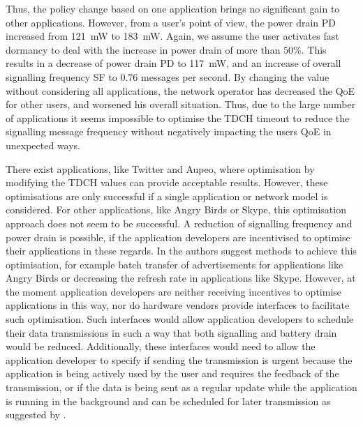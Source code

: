 Thus, the policy change based on one application brings no significant gain to other applications.
However, from a user's point of view, the power drain \gls{PD} increased from \SI{121}{\milli\watt} to \SI{183}{\milli\watt}.
Again, we assume the user activates fast dormancy to deal with the increase in power drain of more than $50\%$.
This results in a decrease of power drain \gls{PD} to \SI{117}{\milli\watt}, and an increase of overall signalling frequency \gls{SF} to \(0.76\) messages per second.
By changing the value without considering all applications, the network operator has decreased the \gls{QoE} for other users, and worsened his overall situation.
Thus, due to the large number of applications it seems impossible to optimise the \gls{TDCH} timeout to reduce the signalling message frequency without negatively impacting the users \gls{QoE} in unexpected ways.

There exist applications, like Twitter and Aupeo, where optimisation by modifying the \gls{TDCH} values can provide acceptable results.
However, these optimisations are only successful if a single application or network model is considered.
For other applications, like Angry Birds or Skype, this optimisation approach does not seem to be successful.
A reduction of signalling frequency and power drain is possible, if the application developers are incentivised to optimise their applications in these regards.
In \cite{Qian2011} the authors suggest methods to achieve this optimisation, for example batch transfer of advertisements for applications like Angry Birds or decreasing the refresh rate in applications like Skype.
However, at the moment application developers are neither receiving incentives to optimise applications in this way, nor do hardware vendors provide interfaces to facilitate such optimisation.
Such interfaces would allow application developers to schedule their data transmissions in such a way that both signalling and battery drain would be reduced.
Additionally, these interfaces would need to allow the application developer to specify if sending the transmission is urgent because the application is being actively used by the user and requires the feedback of the transmission, or if the data is being sent as a regular update while the application is running in the background and can be scheduled for later transmission as suggested by \cite{calder2010, vergara2012}.

